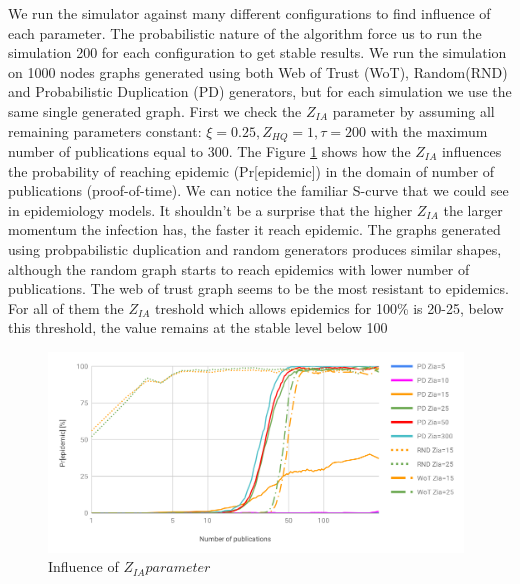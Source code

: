 \documentclass[nostrict]{szablonPG}
\begin{document}
We run the simulator against many different configurations to find influence of each parameter. The probabilistic nature of the algorithm force us to run the simulation 200 for each configuration to get stable results. We run the simulation on 1000 nodes graphs generated using both Web of Trust (WoT), Random(RND) and Probabilistic Duplication (PD) generators, but for each simulation we use the same single generated graph. First we check the $Z_{IA}$ parameter by assuming all remaining parameters constant: $\xi=0.25, Z_{HQ} = 1, \tau=200$ with the maximum number of publications equal to 300. The Figure \ref{fig:influence-of-zia} shows how the $Z_{IA}$ influences the probability of reaching epidemic (Pr[epidemic]) in the domain of number of publications (proof-of-time). We can notice the familiar S-curve that we could see in epidemiology models. It shouldn't be a surprise that the higher $Z_{IA}$ the larger momentum the infection has, the faster it reach epidemic. The graphs generated using probpabilistic duplication and random generators produces similar shapes, although the random graph starts to reach epidemics with lower number of publications. The web of trust graph seems to be the most resistant to epidemics. For all of them the $Z_{IA}$ treshold which allows epidemics for 100\% is 20-25, below this threshold, the value remains at the stable level below 100%
\begin{figure}[h!]
    \includegraphics[width=11cm]{img/influence-of-zia.png}
    \centering
    \caption{Influence of $Z_{IA} parameter$}
    \label{fig:influence-of-zia}
\end{figure} 
\end{document}
